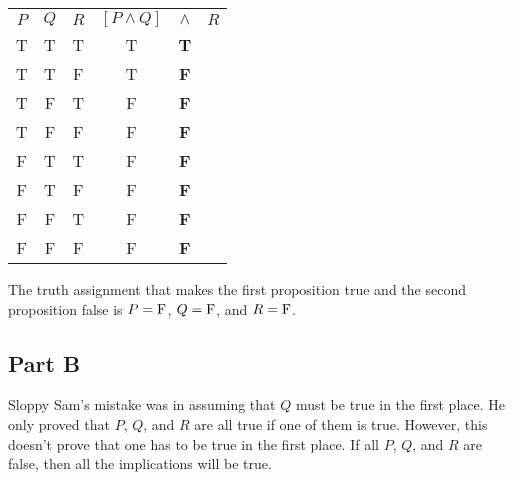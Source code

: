 \documentclass{article}
\begin{document}
\begin{center}
  \begin{tabular}{ c c c c c c }
    $P$ & $Q$ & $R$ & $[P \land Q]$ & $\land$ & $R$ \\
    T & T & T & T & \textbf{T} &  \\
    T & T & F & T & \textbf{F} &  \\
    T & F & T & F & \textbf{F} &  \\
    T & F & F & F & \textbf{F} &  \\
    F & T & T & F & \textbf{F} &  \\
    F & T & F & F & \textbf{F} &  \\
    F & F & T & F & \textbf{F} &  \\
    F & F & F & F & \textbf{F} &  \\
  \end{tabular}
\end{center}

The truth assignment that makes the first proposition true and the second
proposition false is $P = \rm{F}$, $Q = \rm{F}$, and $R = \rm{F}$.

\subsection*{Part B}

Sloppy Sam's mistake was in assuming that $Q$ must be true in the first place.
He only proved that $P$, $Q$, and $R$ are all true if one of them is true.
However, this doesn't prove that one has to be true in the first place. If all
$P$, $Q$, and $R$ are false, then all the implications will be true.
\end{document}
